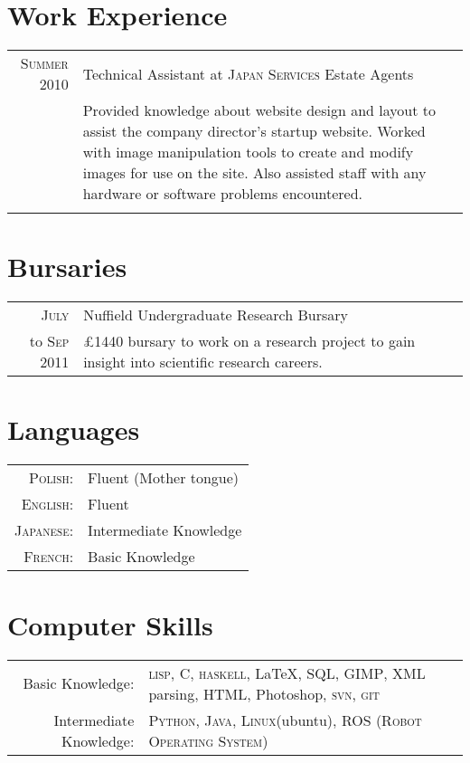 \documentclass[a4paper,10pt]{article}
\begin{document}
\section{Work Experience}
\begin{tabular}{r|p{11cm}}
  \textsc{Summer 2010}& Technical Assistant at \textsc{Japan Services} Estate Agents\\
  &\footnotesize{Provided knowledge about website design and layout to assist the company director's startup website. Worked with image manipulation tools to create and modify images for use on the site. Also assisted staff with any hardware or software problems encountered.}\\\multicolumn{2}{c}{} \\
\end{tabular}

\section{Bursaries}
\begin{tabular}{r|p{11cm}}
  \textsc{July} & Nuffield Undergraduate Research Bursary\\
  to \textsc{Sep 2011}&\footnotesize{£1440 bursary to work on a research project to gain insight into scientific research careers.}
\end{tabular}

\section{Languages}
\begin{tabular}{rl}
  \textsc{Polish:}& Fluent (Mother tongue)\\
  \textsc{English:}&Fluent\\
  \textsc{Japanese:}&Intermediate Knowledge\\
  \textsc{French:}&Basic Knowledge\\
\end{tabular}

\section{Computer Skills}
\begin{tabular}{rp{9cm}}
  Basic Knowledge:& \textsc{lisp}, \textsc{C}, \textsc{haskell}, \LaTeX, \textsc{SQL}, \textsc{GIMP}, \textsc{XML} parsing, \textsc{HTML}, Photoshop, \textsc{svn}, \textsc{git}\\
  Intermediate Knowledge:& \textsc{Python}, \textsc{Java}, \textsc{Linux}(ubuntu), \textsc{ROS (Robot Operating System)}
\end{tabular}
\end{document}
